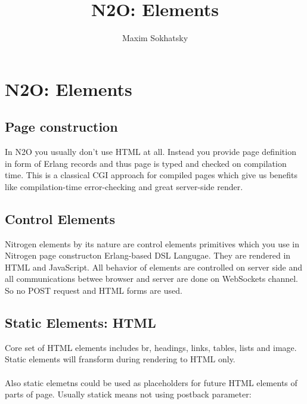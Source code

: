 \documentclass[11pt]{article}
\begin{document}
\title{N2O: Elements}
\author{Maxim Sokhatsky}

\paragraph{}
\section*{N2O: Elements}

\subsection*{Page construction}
In N2O you usually don't use HTML at all. Instead you provide page definition
in form of Erlang records and thus page is typed and checked on compilation time.
This is a classical CGI approach for compiled pages which give us benefits like
compilation-time error-checking and great server-side render.

\subsection*{Control Elements}
Nitrogen elements by its nature are control elements primitives which
you use in Nitrogen page constructon Erlang-based DSL Langugae. 
They are rendered in HTML and JavaScript.
All behavior of elements are controlled on server side and all communications
betwee browser and server are done on WebSockets channel.
So no POST request and HTML forms are used.

\subsection*{Static Elements: HTML}
Core set of HTML elements includes br, headings, links, tables, lists and image.
Static elements will fransform during rendering to HTML only.
\paragraph{}
Also static elemetns could be used
as placeholders for future HTML elements of parts of page.
Usually statick means not using postback parameter:
\end{document}
